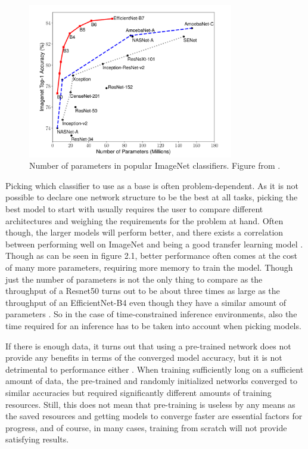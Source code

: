 \begin{figure}[h!] 
\centering 
\includegraphics[width=0.8\textwidth]{imgs/imagenet_parameters.png}
\caption{Number of parameters in popular ImageNet classifiers. Figure from \citep{efficientNet}.\label{fig:params}}
\end{figure}

Picking which classifier to use as a base is often problem-dependent. As it is not possible to declare one network structure to be the best at all tasks, picking the best model to start with usually requires the user to compare different architectures and weighing the requirements for the problem at hand. Often though, the larger models will perform better, and there exists a correlation between performing well on ImageNet and being a good transfer learning model \citep{betterTransfer}. Though as can be seen in figure 2.1, better performance often comes at the cost of many more parameters, requiring more memory to train the model. Though just the number of parameters is not the only thing to compare as the throughput of a Resnet50 \citep{resNet} turns out to be about three times as large as the throughput of an EfficientNet-B4 \citep{efficientNet} even though they have a similar amount of parameters \citep{classifierPerformance}. So in the case of time-constrained inference environments, also the time required for an inference has to be taken into account when picking models.

If there is enough data, it turns out that using a pre-trained network does not provide any benefits in terms of the converged model accuracy, but it is not detrimental to performance either \citep{rethinkTransfer}. When training sufficiently long on a sufficient amount of data, the pre-trained and randomly initialized networks converged to similar accuracies but required significantly different amounts of training resources. Still, this does not mean that pre-training is useless by any means as the saved resources and getting models to converge faster are essential factors for progress, and of course, in many cases, training from scratch will not provide satisfying results.


